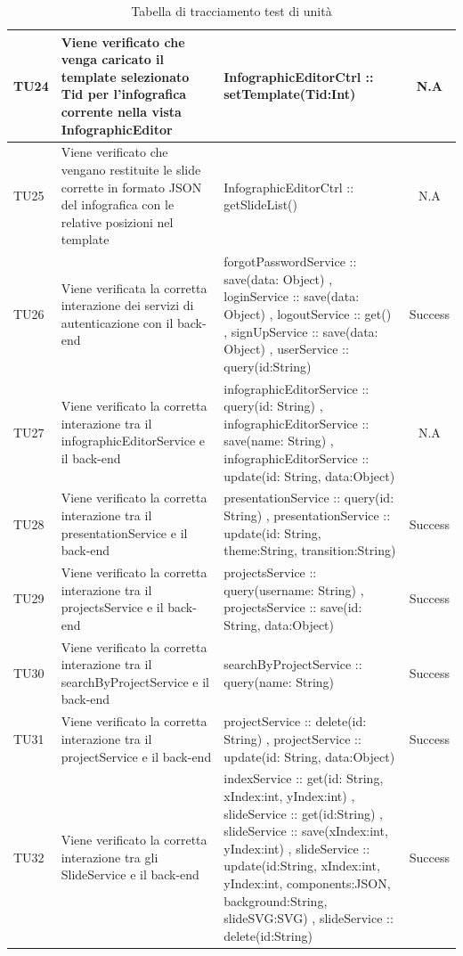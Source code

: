 \begin{table}[H]
\begin{center}
\begin{tabular}{|l|p{}|p{}|c|}

	\toprule
		TU24 & Viene verificato che venga caricato il template selezionato Tid per l'infografica corrente nella vista InfographicEditor & InfographicEditorCtrl :: setTemplate(Tid:Int) & N.A\\
	\midrule
		TU25 & Viene verificato che vengano restituite le slide corrette in formato JSON del infografica con le relative posizioni nel template & InfographicEditorCtrl :: getSlideList() & N.A\\
	\midrule
		TU26 & Viene verificata la corretta interazione dei servizi di autenticazione con il back-end & forgotPasswordService ::  save(data: Object) , loginService :: save(data: Object) , logoutService :: get() , signUpService :: save(data: Object) , userService :: query(id:String) & Success\\
	\midrule
		TU27 & Viene verificato la corretta interazione tra il infographicEditorService e il back-end & infographicEditorService :: query(id: String) , infographicEditorService :: save(name: String) , infographicEditorService :: update(id: String, data:Object) & N.A\\
	\midrule
		TU28 & Viene verificato la corretta interazione tra il presentationService e il back-end & presentationService :: query(id: String) , presentationService :: update(id: String, theme:String, transition:String) & Success\\
	\midrule
		TU29 & Viene verificato la corretta interazione tra il projectsService e il back-end & projectsService :: query(username: String) , projectsService :: save(id: String, data:Object) & Success\\
	\midrule
		TU30 & Viene verificato la corretta interazione tra il searchByProjectService e il back-end & searchByProjectService ::  query(name: String) & Success\\
	\midrule
		TU31 & Viene verificato la corretta interazione tra il projectService e il back-end & projectService :: delete(id: String) , projectService :: update(id: String, data:Object) & Success\\
	\midrule
		TU32 & Viene verificato la corretta interazione tra gli SlideService e il back-end & indexService :: get(id: String, xIndex:int, yIndex:int) , slideService :: get(id:String) , slideService :: save(xIndex:int, yIndex:int) , slideService :: update(id:String, xIndex:int, yIndex:int, components:JSON, background:String,
slideSVG:SVG) , slideService :: delete(id:String) & Success\\

	\bottomrule
	\end{tabular}
	\end{center}
	\caption{Tabella di tracciamento test di unità}
\end{table}